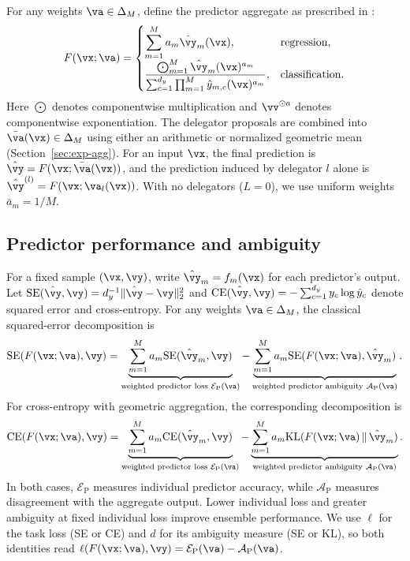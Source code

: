 \documentclass[10pt]{article} %
\newcommand{\pambiguity}{\mathcal{A}_{\mathrm{P}}}
\newcommand{\pperformance}{\mathcal{E}_{\mathrm{P}}}
\begin{document}
For any weights $\va \in \Delta_M$, define the predictor aggregate as prescribed in \citet{wood2023unified}:
\begin{equation}\label{eq:predictor-aggregate}
    F(\vx;\va) =
    \begin{cases}
        \displaystyle\sum_{m=1}^M a_m\hat{\vy}_m(\vx), & \text{regression},\\[2mm]
        \displaystyle\frac{\bigodot_{m=1}^M\hat{\vy}_m(\vx)^{a_m}}
        {\sum_{c=1}^{d_y}\prod_{m=1}^M \hat y_{m,c}(\vx)^{a_m}}, & \text{classification}.
    \end{cases}
\end{equation}
Here $\bigodot$ denotes componentwise multiplication and $\vv^{\odot a}$ denotes componentwise exponentiation. The delegator proposals are combined into $\bar{\va}(\vx) \in \Delta_M$ using either an arithmetic or normalized geometric mean (Section~\ref{sec:exp-agg}). For an input $\vx$, the final prediction is $\hat{\vy} = F(\vx;\bar{\va}(\vx))$, and the prediction induced by delegator $l$ alone is $\hat{\vy}^{(l)} = F(\vx;\va_l(\vx))$. With no delegators ($L=0$), we use uniform weights $\bar a_m = 1/M$. 

\subsection{Predictor performance and ambiguity}

For a fixed sample $(\vx,\vy)$, write $\hat{\vy}_m=f_m(\vx)$ for each predictor's output. Let $\mathrm{SE}(\hat{\vy},\vy)=d_y^{-1}\|\hat{\vy}-\vy\|_2^2$ and $\mathrm{CE}(\hat{\vy},\vy)=-\sum_{c=1}^{d_y}y_c\log\hat y_c$ denote squared error and cross-entropy. For any weights $\va\in\Delta_M$, the classical squared-error decomposition \citep{NIPS1994_b8c37e33} is
\begin{equation}\label{eq:mse-train}
    \mathrm{SE}(F(\vx;\va),\vy)
    = \underbrace{\sum_{m=1}^M a_m\mathrm{SE}(\hat{\vy}_m,\vy)}
        _{\text{weighted predictor loss }\pperformance(\va)}
      -\underbrace{\sum_{m=1}^M a_m\mathrm{SE}(F(\vx;\va),\hat{\vy}_m)}
        _{\text{weighted predictor ambiguity }\pambiguity(\va)}.
\end{equation}
For cross-entropy with geometric aggregation, the corresponding decomposition is \citep{wood2023unified}
\begin{equation}\label{eq:ce-train}
    \mathrm{CE}(F(\vx;\va),\vy)
    = \underbrace{\sum_{m=1}^M a_m\mathrm{CE}(\hat{\vy}_m,\vy)}
        _{\text{weighted predictor loss }\pperformance(\va)}
      -\underbrace{\sum_{m=1}^M a_m\mathrm{KL}(F(\vx;\va)\,\|\,\hat{\vy}_m)}
        _{\text{weighted predictor ambiguity }\pambiguity(\va)}.
\end{equation}
In both cases, $\pperformance$ measures individual predictor accuracy, while $\pambiguity$ measures disagreement with the aggregate output. Lower individual loss and greater ambiguity at fixed individual loss improve ensemble performance. We use $\ell$ for the task loss (SE or CE) and $d$ for its ambiguity measure (SE or KL), so both identities read $\ell(F(\vx;\va),\vy)=\pperformance(\va)-\pambiguity(\va)$.
\end{document}
